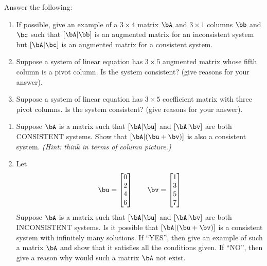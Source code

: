 \documentclass[11pt]{article}
\newcounter{Quesnumb}  %
\newcommand{\problemnum}{%
            \addtocounter{Quesnumb}{1}%
            \arabic{Quesnumb}}
\begin{document}
\begin{problem}{\problemnum} 
Answer the following:
	\begin{enumerate}
	\item If possible, give an example of a $3 \times 4$ matrix $\bA$ and $3 \times 1$ columns $\bb$ and $\bc$ such that $[\bA | \bb]$ is an augmented matrix for an inconsistent system but $[\bA | \bc]$ is an augmented matrix for a consistent system.
	\item Suppose a system of linear equation has $3 \times 5$ \textsf{augmented matrix} whose fifth column is a pivot column. Is the system consistent? (give reasons for your answer).
	\item Suppose a system of linear equation has $3 \times 5$ \textsf{coefficient matrix} with three pivot columns. Is the system consistent? (give reasons for your answer).
	\end{enumerate}
\end{problem}
	
\begin{problem}{\problemnum}
    \begin{enumerate}
    \item Suppose $\bA$ is a matrix such that $[\bA|\bu]$ and $[\bA|\bv]$ are both CONSISTENT systems. Show that $[\bA|(\bu+\bv)]$ is also a consistent system. \textit{(Hint: think in terms of column picture.)}
    \item Let \[\bu =
          \begin{bmatrix}
            0 \\
            2 \\
            4 \\
            6 \\
          \end{bmatrix}
        \qquad
    \bv =        \begin{bmatrix}
          1 \\
          3 \\
          5 \\
          7 \\
        \end{bmatrix}
    \]
Suppose $\bA$ is a matrix such that $[\bA|\bu]$ and $[\bA|\bv]$ are both INCONSISTENT systems. Is it possible that $[\bA|(\bu+\bv)]$ is a consistent system with infinitely many solutions.
If ``YES'', then give an example of such a matrix $\bA$ and show that it satisfies all the conditions given. If ``NO'', then give a reason why would such a matrix $\bA$ not exist.
\end{enumerate}
\end{problem}
\end{document}
